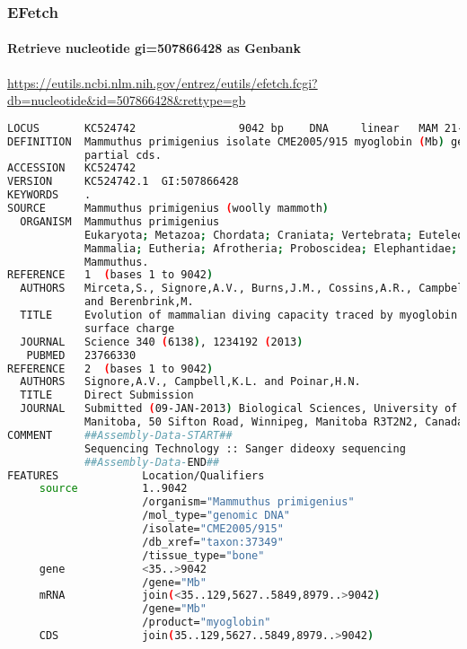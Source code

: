 \documentclass{beamer}
\begin{document}
\begin{frame}[fragile]
\frametitle{EFetch}
\framesubtitle{Retrieve nucleotide gi=507866428 as Genbank}
\url{https://eutils.ncbi.nlm.nih.gov/entrez/eutils/efetch.fcgi?db=nucleotide&id=507866428&rettype=gb}
\begin{lstlisting}[language=bash,basicstyle=\tiny,breaklines=false]
LOCUS       KC524742                9042 bp    DNA     linear   MAM 21-JUN-2013
DEFINITION  Mammuthus primigenius isolate CME2005/915 myoglobin (Mb) gene,
            partial cds.
ACCESSION   KC524742
VERSION     KC524742.1  GI:507866428
KEYWORDS    .
SOURCE      Mammuthus primigenius (woolly mammoth)
  ORGANISM  Mammuthus primigenius
            Eukaryota; Metazoa; Chordata; Craniata; Vertebrata; Euteleostomi;
            Mammalia; Eutheria; Afrotheria; Proboscidea; Elephantidae;
            Mammuthus.
REFERENCE   1  (bases 1 to 9042)
  AUTHORS   Mirceta,S., Signore,A.V., Burns,J.M., Cossins,A.R., Campbell,K.L.
            and Berenbrink,M.
  TITLE     Evolution of mammalian diving capacity traced by myoglobin net
            surface charge
  JOURNAL   Science 340 (6138), 1234192 (2013)
   PUBMED   23766330
REFERENCE   2  (bases 1 to 9042)
  AUTHORS   Signore,A.V., Campbell,K.L. and Poinar,H.N.
  TITLE     Direct Submission
  JOURNAL   Submitted (09-JAN-2013) Biological Sciences, University of
            Manitoba, 50 Sifton Road, Winnipeg, Manitoba R3T2N2, Canada
COMMENT     ##Assembly-Data-START##
            Sequencing Technology :: Sanger dideoxy sequencing
            ##Assembly-Data-END##
FEATURES             Location/Qualifiers
     source          1..9042
                     /organism="Mammuthus primigenius"
                     /mol_type="genomic DNA"
                     /isolate="CME2005/915"
                     /db_xref="taxon:37349"
                     /tissue_type="bone"
     gene            <35..>9042
                     /gene="Mb"
     mRNA            join(<35..129,5627..5849,8979..>9042)
                     /gene="Mb"
                     /product="myoglobin"
     CDS             join(35..129,5627..5849,8979..>9042)

\end{lstlisting}
\end{frame}
\end{document}
